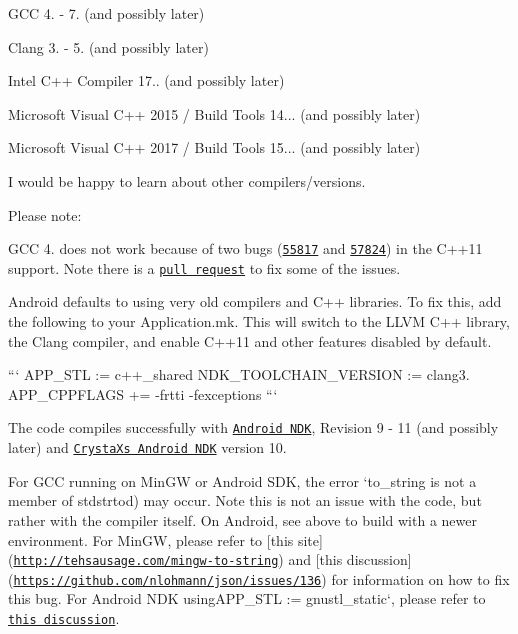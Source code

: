 \begin{DoxyItemize}
\item G\+CC 4. -\/ 7. (and possibly later)
\item Clang 3. -\/ 5. (and possibly later)
\item Intel C++ Compiler 17.. (and possibly later)
\item Microsoft Visual C++ 2015 / Build Tools 14... (and possibly later)
\item Microsoft Visual C++ 2017 / Build Tools 15... (and possibly later)
\end{DoxyItemize}

I would be happy to learn about other compilers/versions.

Please note\+:


\begin{DoxyItemize}
\item G\+CC 4. does not work because of two bugs (\href{https://gcc.gnu.org/bugzilla/show_bug.cgi?id=55817}{\tt 55817} and \href{https://gcc.gnu.org/bugzilla/show_bug.cgi?id=57824}{\tt 57824}) in the C++11 support. Note there is a \href{https://github.com/nlohmann/json/pull/212}{\tt pull request} to fix some of the issues.
\item Android defaults to using very old compilers and C++ libraries. To fix this, add the following to your {\ttfamily Application.\+mk}. This will switch to the L\+L\+VM C++ library, the Clang compiler, and enable C++11 and other features disabled by default.

``` A\+P\+P\+\_\+\+S\+TL \+:= c++\+\_\+shared N\+D\+K\+\_\+\+T\+O\+O\+L\+C\+H\+A\+I\+N\+\_\+\+V\+E\+R\+S\+I\+ON \+:= clang3. A\+P\+P\+\_\+\+C\+P\+P\+F\+L\+A\+GS += -\/frtti -\/fexceptions ```

The code compiles successfully with \href{https://developer.android.com/ndk/index.html?hl=ml}{\tt Android N\+DK}, Revision 9 -\/ 11 (and possibly later) and \href{https://www.crystax.net/en/android/ndk}{\tt CrystaX\textquotesingle{}s Android N\+DK} version 10.
\item For G\+CC running on Min\+GW or Android S\+DK, the error `\textquotesingle{}to\+\_\+string\textquotesingle{} is not a member of \textquotesingle{}stdstrtod{\ttfamily ) may occur. Note this is not an issue with the code, but rather with the compiler itself. On Android, see above to build with a newer environment. For Min\+GW, please refer to \mbox{[}this site\mbox{]}(\href{http://tehsausage.com/mingw-to-string}{\tt http\+://tehsausage.\+com/mingw-\/to-\/string}) and \mbox{[}this discussion\mbox{]}(\href{https://github.com/nlohmann/json/issues/136}{\tt https\+://github.\+com/nlohmann/json/issues/136}) for information on how to fix this bug. For Android N\+DK using}A\+P\+P\+\_\+\+S\+TL \+:= gnustl\+\_\+static`, please refer to \href{https://github.com/nlohmann/json/issues/219}{\tt this discussion}.
\end{DoxyItemize}


